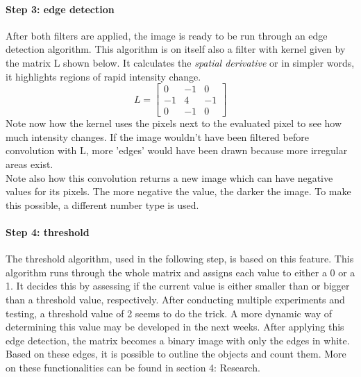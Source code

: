 \documentclass{article}
\begin{document}
\paragraph{Step 3: edge detection}
After both filters are applied, the image is ready to be run through an edge detection algorithm\cite{edge_detection}. This algorithm is on itself also a filter with kernel given by the matrix L shown below.
It calculates the \textit{spatial derivative} or in simpler words, it highlights regions of rapid intensity change.
\begin{equation}
L =\begin{bmatrix}
0&-1&0\\
-1&4&-1\\
0&-1&0
\end{bmatrix}
\end{equation}
\noindent Note now how the kernel uses the pixels next to the evaluated pixel to see how much intensity changes. If the image wouldn't have been filtered before convolution with L, more 'edges' would have been drawn because more irregular areas exist.\\
Note also how this convolution returns a new image which can have negative values for its pixels. The more negative the value, the darker the image. To make this possible, a different number type is used.
\paragraph{Step 4: threshold}
The threshold algorithm, used in the following step, is based on this feature. This algorithm runs through the whole matrix and assigns each value to either a 0 or a 1. It decides this by assessing if the current value is either smaller than or bigger than a threshold value, respectively. After conducting multiple experiments and testing, a threshold value of 2 seems to do the trick. A more dynamic way of determining this value may be developed in the next weeks. After applying this edge detection, the matrix becomes a binary image with only the edges in white. Based on these edges, it is possible to outline the objects and count them. More on these functionalities can be found  in section 4: Research. 
\end{document}
